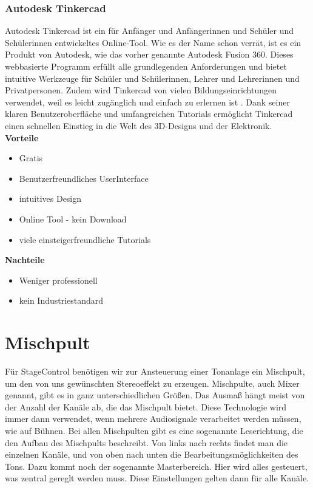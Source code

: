 \subsubsection{Autodesk Tinkercad}
Autodesk Tinkercad ist ein für Anfänger und Anfängerinnen und Schüler und Schülerinnen entwickeltes Online-Tool. Wie es der Name schon verrät, ist es ein Produkt von Autodesk, wie das vorher genannte Autodesk Fusion 360. Dieses webbasierte Programm erfüllt alle grundlegenden Anforderungen und bietet intuitive Werkzeuge für Schüler und Schülerinnen, Lehrer und Lehrerinnen und Privatpersonen. Zudem wird Tinkercad von vielen Bildungseinrichtungen verwendet, weil es leicht zugänglich und einfach zu erlernen ist \parencite{Tinkercad}. Dank seiner klaren Benutzeroberfläche und umfangreichen Tutorials ermöglicht Tinkercad einen schnellen Einstieg in die Welt des 3D-Designs und der Elektronik. \\


\textbf{Vorteile}
\begin{itemize}
	\item Gratis
	\item Benutzerfreundliches UserInterface
	\item intuitives Design
	\item Online Tool - kein Download 	
	\item viele einsteigerfreundliche Tutorials \parencite{TinkercadReviews}
\end{itemize}

\textbf{Nachteile}
\begin{itemize}
	\item Weniger professionell
	\item kein Industriestandard \parencite{TinkercadReviews}
\end{itemize}

\section{Mischpult} \label{Mischpult}
Für StageControl benötigen wir zur Ansteuerung einer Tonanlage ein Mischpult, um den von uns gewünschten Stereoeffekt zu erzeugen. Mischpulte, auch Mixer genannt, gibt es in ganz unterschiedlichen Größen. Das Ausmaß hängt meist von der Anzahl der Kanäle ab, die das Mischpult bietet. Diese Technologie wird immer dann verwendet, wenn mehrere Audiosignale verarbeitet werden müssen, wie auf Bühnen. \parencite{MischpultInformation} Bei allen Mischpulten gibt es eine sogenannte Leserichtung, die den Aufbau des Mischpults beschreibt. Von links nach rechts findet man die einzelnen Kanäle, und von oben nach unten die Bearbeitungsmöglichkeiten des Tons. Dazu kommt noch der sogenannte Masterbereich. Hier wird alles gesteuert, was zentral gereglt werden muss. Diese Einstellungen gelten dann für alle Kanäle.  \parencite{MischpultMaster} \\


